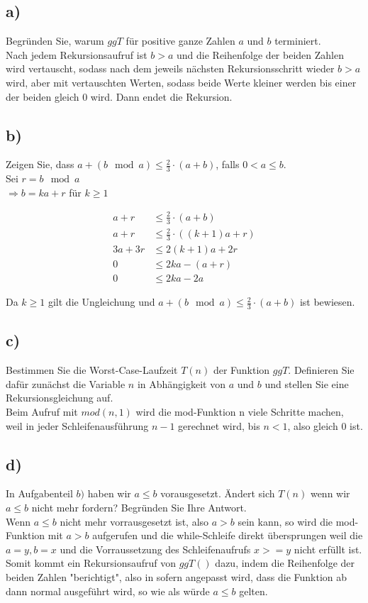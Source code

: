 \documentclass[a4paper]{article}
\begin{document}
\subsection*{a)}
Begründen Sie, warum $ggT$ für positive ganze Zahlen $a$ und $b$ terminiert.\\

Nach jedem Rekursionsaufruf ist $b > a$ und die Reihenfolge der beiden Zahlen wird vertauscht, sodass nach dem jeweils nächsten Rekursionsschritt wieder $b > a$ wird, aber mit vertauschten Werten, sodass beide Werte kleiner werden bis einer der beiden gleich 0 wird. Dann endet die Rekursion.

\subsection*{b)}
Zeigen Sie, dass $a + (b \mod{a}) \leq \frac{2}{3} \cdot (a + b)$, falls $0 < a \leq b.$\\

Sei $r = b \mod a$\\
$\Rightarrow b = ka + r$ für $k \geq 1$

\begin{align*}
a + r &\leq \frac{2}{3} \cdot (a + b) \\
a + r &\leq \frac{2}{3} \cdot ((k + 1)a + r)\\
3a + 3r &\leq 2(k + 1)a + 2r\\
0 &\leq 2ka − (a + r)\\
0 &\leq 2ka − 2a
\end{align*}

Da $k \geq 1$ gilt die Ungleichung und $a + (b \mod{a}) \leq \frac{2}{3} \cdot (a + b)$ ist bewiesen.


\subsection*{c)}
Bestimmen Sie die Worst-Case-Laufzeit $T(n)$ der Funktion $ggT$. Definieren Sie dafür zunächst
die Variable $n$ in Abhängigkeit von $a$ und $b$ und stellen Sie eine Rekursionsgleichung auf.\\

Beim Aufruf mit $mod(n, 1)$ wird die mod-Funktion n viele Schritte machen, weil in jeder Schleifenausführung $n - 1$ gerechnet wird, bis $n < 1$, also gleich 0 ist.

\subsection*{d)}
In Aufgabenteil $b)$ haben wir $a \leq b$ vorausgesetzt. Ändert sich $T(n)$ wenn wir $a \leq b$ nicht
mehr fordern? Begründen Sie Ihre Antwort.\\

Wenn $a \leq b$ nicht mehr vorrausgesetzt ist, also $a > b$ sein kann, so wird die mod-Funktion mit $a > b$ aufgerufen und die while-Schleife direkt übersprungen weil die $a = y, b = x$ und die Vorraussetzung des Schleifenaufrufs $x >= y$ nicht erfüllt ist. Somit kommt ein Rekursionsaufruf von $ggT()$ dazu, indem die Reihenfolge der beiden Zahlen "berichtigt", also in sofern angepasst wird, dass die Funktion ab dann normal ausgeführt wird, so wie als würde $a \leq b$ gelten.
\end{document}
